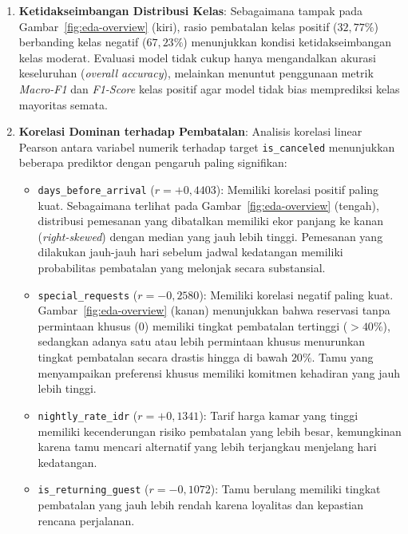 \begin{enumerate}
  \item \textbf{Ketidakseimbangan Distribusi Kelas}:
        Sebagaimana tampak pada Gambar~\ref{fig:eda-overview} (kiri), rasio pembatalan kelas positif ($32{,}77\%$)
        berbanding kelas negatif ($67{,}23\%$) menunjukkan kondisi ketidakseimbangan kelas moderat. Evaluasi model
        tidak cukup hanya mengandalkan akurasi keseluruhan (\textit{overall accuracy}), melainkan menuntut penggunaan
        metrik \textit{Macro-F1} dan \textit{F1-Score} kelas positif agar model tidak bias memprediksi kelas mayoritas semata.
  \item \textbf{Korelasi Dominan terhadap Pembatalan}:
        Analisis korelasi linear Pearson antara variabel numerik terhadap target \texttt{is\_canceled} menunjukkan
        beberapa prediktor dengan pengaruh paling signifikan:
        \begin{itemize}
          \item \texttt{days\_before\_arrival} ($r = +0{,}4403$): Memiliki korelasi positif paling kuat.
                Sebagaimana terlihat pada Gambar~\ref{fig:eda-overview} (tengah), distribusi pemesanan yang dibatalkan
                memiliki ekor panjang ke kanan (\textit{right-skewed}) dengan median yang jauh lebih tinggi.
                Pemesanan yang dilakukan jauh-jauh hari sebelum jadwal kedatangan memiliki probabilitas
                pembatalan yang melonjak secara substansial.
          \item \texttt{special\_requests} ($r = -0{,}2580$): Memiliki korelasi negatif paling kuat.
                Gambar~\ref{fig:eda-overview} (kanan) menunjukkan bahwa reservasi tanpa permintaan khusus ($0$)
                memiliki tingkat pembatalan tertinggi ($> 40\%$), sedangkan adanya satu atau lebih permintaan
                khusus menurunkan tingkat pembatalan secara drastis hingga di bawah $20\%$. Tamu yang menyampaikan
                preferensi khusus memiliki komitmen kehadiran yang jauh lebih tinggi.
          \item \texttt{nightly\_rate\_idr} ($r = +0{,}1341$): Tarif harga kamar yang tinggi memiliki
                kecenderungan risiko pembatalan yang lebih besar, kemungkinan karena tamu mencari alternatif
                yang lebih terjangkau menjelang hari kedatangan.
          \item \texttt{is\_returning\_guest} ($r = -0{,}1072$): Tamu berulang memiliki tingkat pembatalan
                yang jauh lebih rendah karena loyalitas dan kepastian rencana perjalanan.

\end{itemize}
\end{enumerate}
